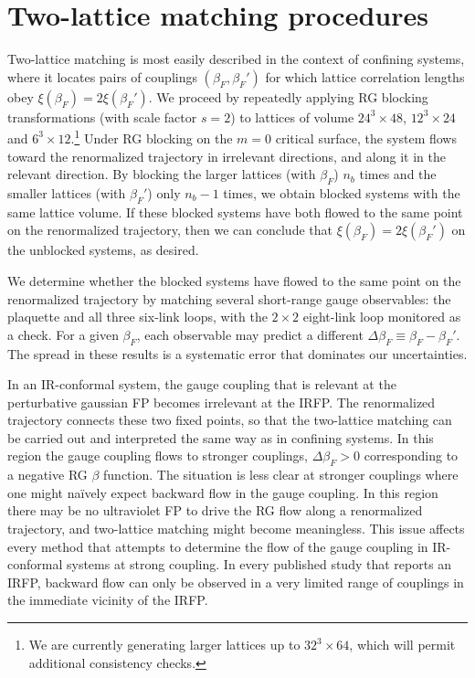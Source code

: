 \documentclass{PoS}
\newcommand{\be}{\ensuremath{\beta} }
\newcommand{\De}{\ensuremath{\Delta} }
\newcommand{\X}{\ensuremath{\!\times\!} }
\begin{document}
\section{Two-lattice matching procedures} %
Two-lattice matching is most easily described in the context of confining systems, where it locates pairs of couplings $(\be_F, \be_F')$ for which lattice correlation lengths obey $\xi(\be_F) = 2\xi(\be_F')$.
We proceed by repeatedly applying RG blocking transformations (with scale factor $s = 2$) to lattices of volume $24^3\X48$, $12^3\X24$ and $6^3\X12$.\footnote{We are currently generating larger lattices up to $32^3\X64$, which will permit additional consistency checks.}
Under RG blocking on the $m = 0$ critical surface, the system flows toward the renormalized trajectory in irrelevant directions, and along it in the relevant direction.
By blocking the larger lattices (with $\be_F$) $n_b$ times and the smaller lattices (with $\be_F'$) only $n_b - 1$ times, we obtain blocked systems with the same lattice volume.
If these blocked systems have both flowed to the same point on the renormalized trajectory, then we can conclude that $\xi(\be_F) = 2\xi(\be_F')$ on the unblocked systems, as desired.

We determine whether the blocked systems have flowed to the same point on the renormalized trajectory by matching several short-range gauge observables: the plaquette and all three six-link loops, with the $2\X2$ eight-link loop monitored as a check.
For a given $\be_F$, each observable may predict a different $\De\be_F \equiv \be_F - \be_F'$.
The spread in these results is a systematic error that dominates our uncertainties.

In an IR-conformal system, the gauge coupling that is relevant at the perturbative gaussian FP becomes irrelevant at the IRFP.
The renormalized trajectory connects these two fixed points, so that the two-lattice matching can be carried out and interpreted the same way as in confining systems.
In this region the gauge coupling flows to stronger couplings, $\De\be_F > 0$ corresponding to a negative RG \be function.
The situation is less clear at stronger couplings where one might na\"ively expect backward flow in the gauge coupling.
In this region there may be no ultraviolet FP to drive the RG flow along a renormalized trajectory, and two-lattice matching might become meaningless.
This issue affects every method that attempts to determine the flow of the gauge coupling in IR-conformal systems at strong coupling.
In every published study that reports an IRFP, backward flow can only be observed in a very limited range of couplings in the immediate vicinity of the IRFP. %
\end{document}
